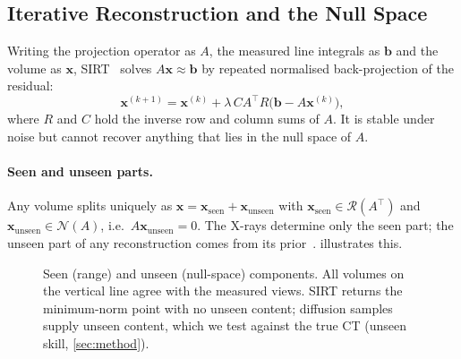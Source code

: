 \subsection{Iterative Reconstruction and the Null Space}
 Writing the projection operator as $A$, the measured line integrals as $\mathbf{b}$ and the volume as $\mathbf{x}$, SIRT~\cite{gilbert1972sirt,herman2009} solves $A\mathbf{x}\approx\mathbf{b}$ by repeated normalised back-projection of the residual:
\begin{equation}
  \mathbf{x}^{(k+1)} = \mathbf{x}^{(k)} + \lambda\, C A^{\top} R \big(\mathbf{b} - A\mathbf{x}^{(k)}\big),
\end{equation}
where $R$ and $C$ hold the inverse row and column sums of $A$. It is stable under noise but cannot recover anything that lies in the null space of $A$.

\paragraph{Seen and unseen parts.} Any volume splits uniquely as $\mathbf{x} = \mathbf{x}_{\text{seen}} + \mathbf{x}_{\text{unseen}}$ with $\mathbf{x}_{\text{seen}} \in \mathcal{R}(A^{\top})$ and $\mathbf{x}_{\text{unseen}} \in \mathcal{N}(A)$, i.e.\ $A\mathbf{x}_{\text{unseen}}=0$. The X-rays determine only the seen part; the unseen part of any reconstruction comes from its prior~\cite{bhadra2021,wang2023ddnm}.  illustrates this.

\begin{figure}[htbp]
  \centering
  \resizebox{0.82\linewidth}{!}{}
  \caption[Seen and unseen components of a reconstruction]{Seen (range) and unseen (null-space) components. All volumes on the vertical line agree with the measured views. SIRT returns the minimum-norm point with no unseen content; diffusion samples supply unseen content, which we test against the true CT (unseen skill, \cref{sec:method}).}
  \label{fig:seen}
\end{figure}

